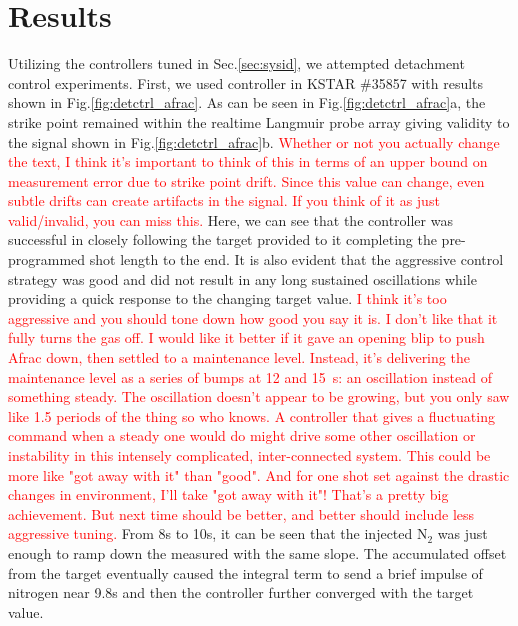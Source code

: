 \section{Results}
\label{sec:results}





Utilizing the controllers tuned in Sec.\ref{sec:sysid}, we attempted detachment control experiments.
First, we used \Afrac controller in KSTAR \#35857 with results shown in Fig.\ref{fig:detctrl_afrac}.
As can be seen in Fig.\ref{fig:detctrl_afrac}a, the strike point remained within the realtime Langmuir probe array giving validity to the \Afrac signal shown in Fig.\ref{fig:detctrl_afrac}b.
\textcolor{red}{Whether or not you actually change the text, I think it's important to think of this in terms of an upper bound on measurement error due to strike point drift. Since this value can change, even subtle drifts can create artifacts in the signal. If you think of it as just valid/invalid, you can miss this.}
Here, we can see that the controller was successful in closely following the target provided to it completing the pre-programmed shot length to the end.
It is also evident that the aggressive control strategy was good and did not result in any long sustained oscillations while providing a quick response to the changing target value.
\textcolor{red}{I think it's too aggressive and you should tone down how good you say it is. I don't like that it fully turns the gas off. I would like it better if it gave an opening blip to push Afrac down, then settled to a maintenance level. Instead, it's delivering the maintenance level as a series of bumps at 12 and 15~s: an oscillation instead of something steady. The oscillation doesn't appear to be growing, but you only saw like 1.5 periods of the thing so who knows. A controller that gives a fluctuating command when a steady one would do might drive some other oscillation or instability in this intensely complicated, inter-connected system. This could be more like "got away with it" than "good". And for one shot set against the drastic changes in environment, I'll take "got away with it"! That's a pretty big achievement. But next time should be better, and better should include less aggressive tuning.}
From 8s to 10s, it can be seen that the injected N$_2$ was just enough to ramp down the measured \Afrac with the same slope.
The accumulated offset from the target eventually caused the integral term to send a brief impulse of nitrogen near 9.8s and then the controller further converged with the target value.
